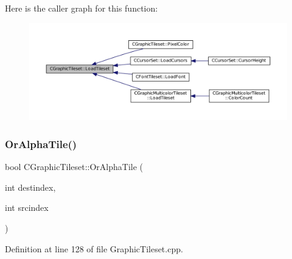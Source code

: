 Here is the caller graph for this function\+:
\nopagebreak
\begin{figure}[H]
\begin{center}
\leavevmode
\includegraphics[width=350pt]{classCGraphicTileset_a7d47754f26f03958be28a064f54eef1d_icgraph}
\end{center}
\end{figure}
\hypertarget{classCGraphicTileset_ae456fe77a33c9954b6a22133f5843a15}{}\label{classCGraphicTileset_ae456fe77a33c9954b6a22133f5843a15} 
\subsubsection{\texorpdfstring{Or\+Alpha\+Tile()}{OrAlphaTile()}}
{\footnotesize\ttfamily bool C\+Graphic\+Tileset\+::\+Or\+Alpha\+Tile (\begin{DoxyParamCaption}\item[{int}]{destindex,  }\item[{int}]{srcindex }\end{DoxyParamCaption})}



Definition at line 128 of file Graphic\+Tileset.\+cpp.


